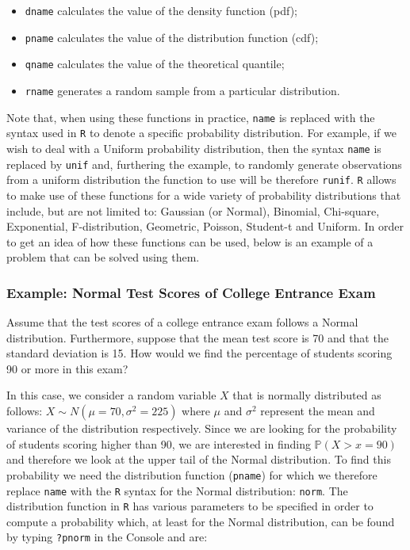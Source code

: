 \documentclass[]{book}
\providecommand{\tightlist}{%
  \setlength{\itemsep}{0pt}\setlength{\parskip}{0pt}}
\theoremstyle{definition}
\theoremstyle{definition}
\theoremstyle{remark}
\begin{document}
\begin{itemize}
\tightlist
\item
  \texttt{dname} calculates the value of the density function (pdf);
\item
  \texttt{pname} calculates the value of the distribution function
  (cdf);
\item
  \texttt{qname} calculates the value of the theoretical quantile;
\item
  \texttt{rname} generates a random sample from a particular
  distribution.
\end{itemize}

Note that, when using these functions in practice, \texttt{name} is
replaced with the syntax used in \texttt{R} to denote a specific
probability distribution. For example, if we wish to deal with a Uniform
probability distribution, then the syntax \texttt{name} is replaced by
\texttt{unif} and, furthering the example, to randomly generate
observations from a uniform distribution the function to use will be
therefore \texttt{runif}. \texttt{R} allows to make use of these
functions for a wide variety of probability distributions that include,
but are not limited to: Gaussian (or Normal), Binomial, Chi-square,
Exponential, F-distribution, Geometric, Poisson, Student-t and Uniform.
In order to get an idea of how these functions can be used, below is an
example of a problem that can be solved using them.

\subsubsection{Example: Normal Test Scores of College Entrance
Exam}\label{example-normal-test-scores-of-college-entrance-exam}

Assume that the test scores of a college entrance exam follows a Normal
distribution. Furthermore, suppose that the mean test score is 70 and
that the standard deviation is 15. How would we find the percentage of
students scoring 90 or more in this exam?

In this case, we consider a random variable \(X\) that is normally
distributed as follows: \(X \sim N(\mu=70, \sigma^2=225)\) where \(\mu\)
and \(\sigma^2\) represent the mean and variance of the distribution
respectively. Since we are looking for the probability of students
scoring higher than 90, we are interested in finding
\(\mathbb{P}(X > x=90)\) and therefore we look at the upper tail of the
Normal distribution. To find this probability we need the distribution
function (\texttt{pname}) for which we therefore replace \texttt{name}
with the \texttt{R} syntax for the Normal distribution: \texttt{norm}.
The distribution function in \texttt{R} has various parameters to be
specified in order to compute a probability which, at least for the
Normal distribution, can be found by typing \texttt{?pnorm} in the
Console and are:
\end{document}
